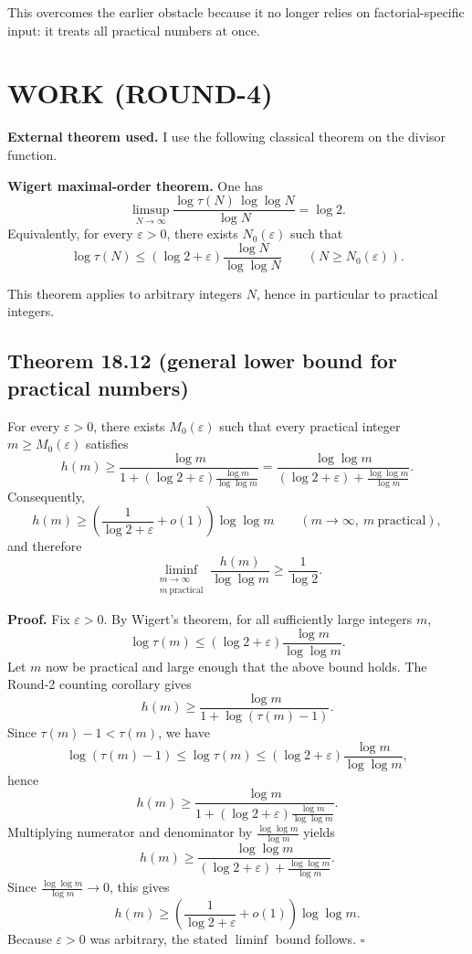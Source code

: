 This overcomes the earlier obstacle because it no longer relies on factorial-specific input: it treats all practical numbers at once.

\section{WORK (ROUND-4)}

\textbf{External theorem used.} I use the following classical theorem on the divisor function.

\medskip

\noindent\textbf{Wigert maximal-order theorem.}
One has
\[
\limsup_{N\to\infty}\frac{\log \tau(N)\,\log\log N}{\log N}=\log 2.
\]
Equivalently, for every \(\varepsilon>0\), there exists \(N_0(\varepsilon)\) such that
\[
\log \tau(N)\le (\log 2+\varepsilon)\frac{\log N}{\log\log N}
\qquad (N\ge N_0(\varepsilon)).
\]

\medskip

This theorem applies to arbitrary integers \(N\), hence in particular to practical integers.

\subsection*{Theorem 18.12 (general lower bound for practical numbers)}

For every \(\varepsilon>0\), there exists \(M_0(\varepsilon)\) such that every practical integer \(m\ge M_0(\varepsilon)\) satisfies
\[
h(m)\ge
\frac{\log m}{1+(\log 2+\varepsilon)\frac{\log m}{\log\log m}}
=
\frac{\log\log m}{(\log 2+\varepsilon)+\frac{\log\log m}{\log m}}.
\]
Consequently,
\[
h(m)\ge \left(\frac1{\log 2+\varepsilon}+o(1)\right)\log\log m
\qquad (m\to\infty,\ m\ \text{practical}),
\]
and therefore
\[
\liminf_{\substack{m\to\infty\\ m\ \mathrm{practical}}}
\frac{h(m)}{\log\log m}\ge \frac1{\log 2}.
\]

\medskip

\noindent\textbf{Proof.}
Fix \(\varepsilon>0\). By Wigert's theorem, for all sufficiently large integers \(m\),
\[
\log \tau(m)\le (\log 2+\varepsilon)\frac{\log m}{\log\log m}.
\]
Let \(m\) now be practical and large enough that the above bound holds. The Round-2 counting corollary gives
\[
h(m)\ge \frac{\log m}{1+\log(\tau(m)-1)}.
\]
Since \(\tau(m)-1<\tau(m)\), we have
\[
\log(\tau(m)-1)\le \log\tau(m)\le (\log 2+\varepsilon)\frac{\log m}{\log\log m},
\]
hence
\[
h(m)\ge
\frac{\log m}{1+(\log 2+\varepsilon)\frac{\log m}{\log\log m}}.
\]
Multiplying numerator and denominator by \(\frac{\log\log m}{\log m}\) yields
\[
h(m)\ge
\frac{\log\log m}{(\log 2+\varepsilon)+\frac{\log\log m}{\log m}}.
\]
Since \(\frac{\log\log m}{\log m}\to 0\), this gives
\[
h(m)\ge \left(\frac1{\log 2+\varepsilon}+o(1)\right)\log\log m.
\]
Because \(\varepsilon>0\) was arbitrary, the stated \(\liminf\) bound follows.
\hfill\(\square\)

